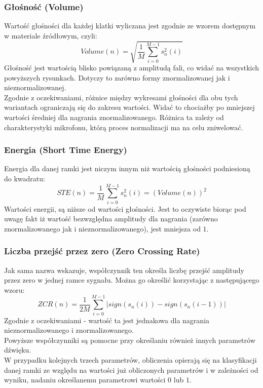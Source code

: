 \documentclass[a4paper]{article}
\begin{document}
\subsubsection{Głośność (Volume)}
Wartość głośności dla każdej klatki wyliczana jest zgodnie ze wzorem dostępnym w materiale źródłowym, czyli:
\begin{equation}
Volume(n) = \sqrt{\frac{1}{M} \sum_{i=0}^{M-1}s_n^2(i)}
\end{equation}
Głośność jest wartością blisko powiązaną z amplitudą fali, co widać na wszystkich powyższych rysunkach. Dotyczy to zarówno formy znormalizowanej jak i nieznormalizowanej.\\
Zgodnie z oczekiwaniami, różnice między wykresami głośności dla obu tych wariantach ograniczają się do zakresu wartości. Widać to chociażby po mniejszej wartości średniej dla nagrania znormalizowanego. Różnica ta zależy od charakterystyki mikrofonu, którą proces normalizacji ma na celu zniwelować.

\subsubsection{Energia (Short Time Energy)}
Energia dla danej ramki jest niczym innym niż wartością głośności podniesioną do kwadratu:
\begin{equation}
STE(n) = \frac{1}{M} \sum_{i=0}^{M-1}s_n^2(i) = (Volume(n))^2
\end{equation}
Wartości energii, są niższe od wartości głośności. Jest to oczywiste biorąc pod uwagę fakt iż wartość bezwzględna amplitudy dla nagrania (zarówno znormalizowanego jak i nieznormalizowanego), jest mniejsza od $1$. 

\subsubsection{Liczba przejść przez zero (Zero Crossing Rate)}
Jak sama nazwa wskazuje, współczynnik ten określa liczbę przejść amplitudy przez zero w jednej ramce sygnału. Można go określić korzystając z następującego wzoru:
\begin{equation}
ZCR(n) = \frac{1}{2M} \sum_{i=0}^{M-1}|sign(s_n(i)) - sign(s_n(i-1))|
\end{equation}
Zgodnie z oczekiwaniami - wartość ta jest jednakowa dla nagrania nieznormalizowanego i znormalizowanego.
\vspace{0.25in}\\
Powyższe współczynniki są pomocne przy określaniu również innych parametrów dźwięku.\\
W przypadku kolejnych trzech parametrów, obliczenia opierają się na klasyfikacji danej ramki ze względu na wartości już obliczonych parametrów i w zależności od wyniku, nadaniu określanemu parametrowi wartości $0$ lub $1$.
\end{document}
